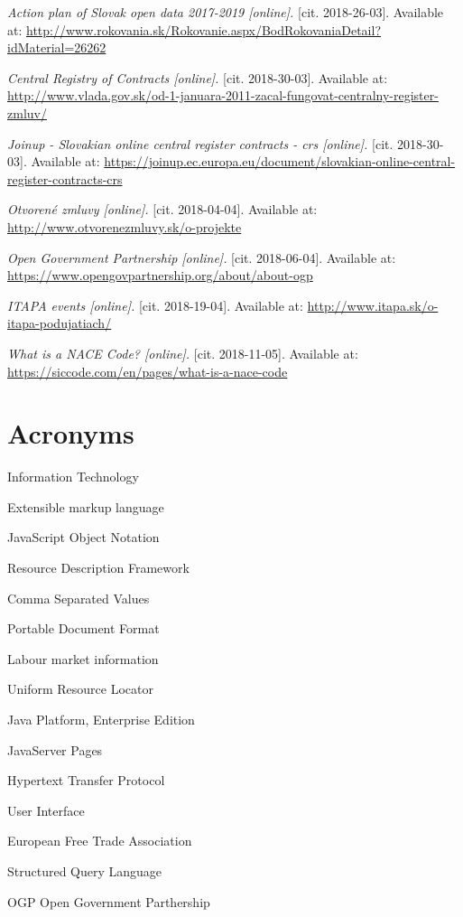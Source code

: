 \documentclass[thesis=B,english]{sprlajur-slovakopendata}[2018/05/12]
\begin{document}
{\begin{thebibliography}{9}
		\textit{Action plan of Slovak open data 2017-2019 [online].}
		[cit. 2018-26-03]. Available at: \url{http://www.rokovania.sk/Rokovanie.aspx/BodRokovaniaDetail?idMaterial=26262}
		
		\textit{Central Registry of Contracts [online].}
		[cit. 2018-30-03]. Available at: \url{http://www.vlada.gov.sk/od-1-januara-2011-zacal-fungovat-centralny-register-zmluv/}
		
		\textit{Joinup - Slovakian online central register contracts - crs [online].}
		[cit. 2018-30-03]. Available at: \url{https://joinup.ec.europa.eu/document/slovakian-online-central-register-contracts-crs}
		
		\textit{Otvorené zmluvy [online].}
		[cit. 2018-04-04]. Available at: \url{http://www.otvorenezmluvy.sk/o-projekte}
		
		\textit{Open Government Partnership [online].}
		[cit. 2018-06-04]. Available at: \url{https://www.opengovpartnership.org/about/about-ogp}
		
		\textit{ITAPA events [online].}
		[cit. 2018-19-04]. Available at: \url{http://www.itapa.sk/o-itapa-podujatiach/}
		
		\textit{What is a NACE Code? [online].}
		[cit. 2018-11-05]. Available at: \url{https://siccode.com/en/pages/what-is-a-nace-code}
		
	\end{thebibliography}
	
	\chapter*{Acronyms}
	\begin{description}
		\item[IT] Information Technology
		\item[XML] Extensible markup language
		\item[JSON] JavaScript Object Notation
		\item[RDF] Resource Description Framework
		\item[CSV] Comma Separated Values
		\item[PDF] Portable Document Format
		\item[LMI] Labour market information
		\item[URL] Uniform Resource Locator
		\item[Java EE] Java Platform, Enterprise Edition
		\item[JSP] JavaServer Pages
		\item[HTTP] Hypertext Transfer Protocol
		\item[UI] User Interface
		\item[EFTA] European Free Trade Association 
		\item[SQL] Structured Query Language
		\item{OGP} Open Government Parthership
	\end{description}
	
}
\end{document}
